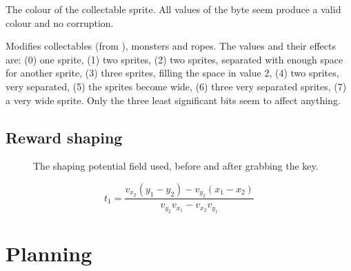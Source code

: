 {\begin{enumerate}
 The colour of the collectable sprite. All values
of the byte seem produce a valid colour and no corruption.

 Modifies collectables (from
\hyperref[ram:collectable]{}), monsters and ropes. The values and their
effects are: (0) one sprite, (1) two sprites, (2) two sprites, separated with enough
space for another sprite, (3) three sprites, filling the space in value 2, (4)
two sprites, very separated, (5) the sprites become wide, (6) three very
separated sprites, (7) a very wide sprite. Only the three least significant bits
seem to affect anything.

\end{enumerate}
}

\subsection{Reward shaping\label{subsection:reward-shaping}}
\begin{figure}[hbtp]
\begin{center}
\noindent{}
\end{center}
\caption{The shaping potential field used, before and after grabbing the
key.\label{fig:shaping}}
\end{figure}
\begin{equation}
  t_1 = \frac{v_{x_2}(y_1-y_2) - v_{y_2}(x_1-x_2)}{v_{y_2}v_{x_1} - v_{x_2}v_{y_1}}
\end{equation}
\section{Planning}
